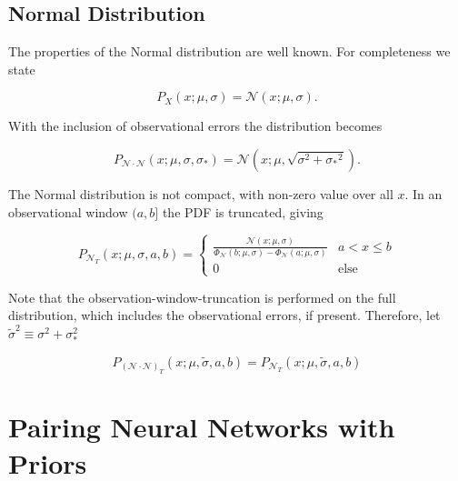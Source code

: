 \documentclass[twocolumn, linenumbers]{aastex631}
\newcommand{\mcal}[1]{\mathcal{#1}}
\newcommand{\sigobs}{{\sigma_*}}
\begin{document}
    \subsection{Normal Distribution} \label{app:sub:normal_distribution}

        The properties of the Normal distribution are well known. For
        completeness we state

        \begin{equation}
            P_X(x; \mu, \sigma) = \mcal{N}(x; \mu, \sigma).
        \end{equation}

        With the inclusion of observational errors the distribution becomes

        \begin{equation}
            P_{\mcal{N}\cdot\mcal{N}}(x; \mu, \sigma, \sigobs) = \mcal{N}(x; \mu, \sqrt{\sigma^2 + \sigobs^2}).
        \end{equation}

        The Normal distribution is not compact, with non-zero value over all
        $x$. In an observational window $(a,b]$ the PDF is truncated, giving

        \begin{equation}
            P_{\mcal{N}_T}(x; \mu, \sigma, a, b) = \begin{cases}
                \frac{\mcal{N}(x; \mu, \sigma)}{\Phi_\mcal{N}(b; \mu, \sigma) - \Phi_\mcal{N}(a; \mu, \sigma)} & a < x \leq b \\
                0 & \text{else}
            \end{cases}
        \end{equation}

        Note that the observation-window-truncation is performed on the full
        distribution, which includes the observational errors, if present.
        Therefore, let $\tilde{\sigma}^2 \equiv \sigma^2+\sigma_*^2$

        \begin{equation}
            P_{(\mcal{N}\cdot\mcal{N})_T}(x; \mu, \tilde{\sigma}, a, b) = P_{\mcal{N}_T}(x; \mu, \tilde{\sigma}, a, b)
        \end{equation}


\newpage
\section{Pairing Neural Networks with Priors} \label{app:nns_and_priors}
\end{document}

